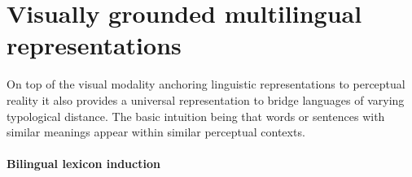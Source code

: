 
\section{Visually grounded multilingual representations}
On top of the visual modality anchoring linguistic representations to perceptual reality it
also provides a universal representation to bridge languages of varying typological distance.
The basic intuition being that words or sentences with similar meanings appear
within similar perceptual contexts.

\paragraph{Bilingual lexicon induction}

